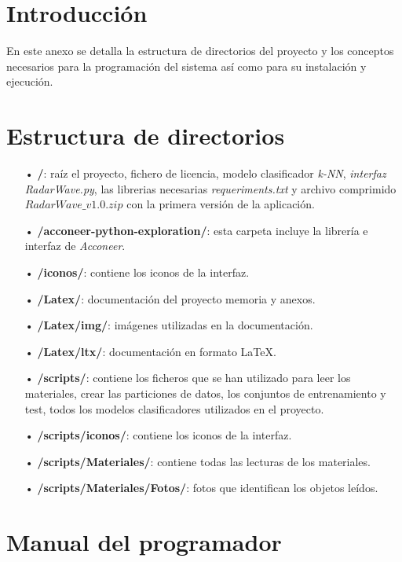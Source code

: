 
\section{Introducción}
En este anexo se detalla la estructura de directorios del proyecto y los conceptos necesarios para la programación del sistema así como para su instalación y ejecución. 

\section{Estructura de directorios}
\begin{itemize}
	\tightlist
	\item[•] \textbf{/}: raíz el proyecto, fichero de licencia, modelo clasificador \textit{k-NN}, \textit{interfaz RadarWave.py}, las librerias necesarias \textit{requeriments.txt} y archivo comprimido \textit{$RadarWave\_v1.0.zip$} con la primera versión de la aplicación.
	\item[•] \textbf{/acconeer-python-exploration/}: esta carpeta incluye la librería e interfaz de \textit{Acconeer}.
	\item[•] \textbf{/iconos/}: contiene los iconos de la interfaz.
	\item[•] \textbf{/Latex/}: documentación del proyecto memoria y anexos.
	\item[•] \textbf{/Latex/img/}: imágenes utilizadas en la documentación.
	\item[•] \textbf{/Latex/ltx/}: documentación en formato \LaTeX.
	\item[•] \textbf{/scripts/}: contiene los ficheros que se han utilizado para leer los materiales, crear las particiones de datos, los conjuntos de entrenamiento y test, todos los modelos clasificadores utilizados en el proyecto.
	\item[•] \textbf{/scripts/iconos/}: contiene los iconos de la interfaz.
	\item[•] \textbf{/scripts/Materiales/}: contiene todas las lecturas de los materiales.
	\item[•] \textbf{/scripts/Materiales/Fotos/}: fotos que identifican los objetos leídos.
\end{itemize}

\section{Manual del programador}

